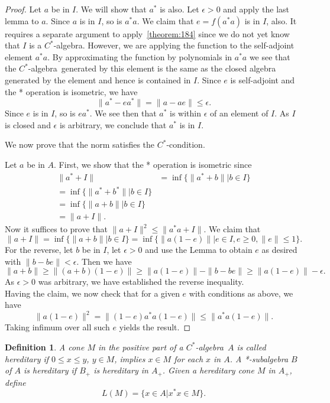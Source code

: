 \documentclass{book}
\newtheorem{definition}{Definition}[section]
\def\cstar{\(C^*\)-algebra}
\begin{document}
\begin{proof}
  Let \(a\) be in \(I\). We will show that \(a^*\) is also. Let \(\epsilon> 0\) and apply
  the last lemma to \(a\). Since \(a\) is in \(I\), so is \(a^*a\). We claim that \(e = f(a^*a)\) is
  in \(I\), also. It requires a separate argument to apply~\ref{theorem:184} since we do not yet
  know that \(I\) is a \cstar. However, we are applying the function to the
  self-adjoint element \(a^*a\). By approximating the function by polynomials in
  \(a^*a\) we see that the \cstar\ generated by this element is the same as the
  closed algebra generated by the element and hence is contained in \(I\).
  Since \(e\) is self-adjoint and the * operation is isometric, we have
  \[\|a^* - ea^*\| = \|a-ae\| \leq \epsilon.\]
  Since \(e\) is in \(I\), so is \(ea^*\). We see then that \(a^*\) is within \(\epsilon\) of an element of \(I\).
  As \(I\) is closed and \(\epsilon\) is arbitrary, we conclude that \(a^*\) is in \(I\).\par
  We now prove that the norm satisfies the \(C^*\)-condition.\par
  Let \(a\) be in \(A\). First, we show that the * operation is isometric since
  \begin{align*}
    \|a^* +I\| &= \inf\{\|a^*+b\| |b\in I\}\\
    = \inf\{\|a^* +b^*\| | b \in I\}\\
    = \inf\{\|a+b\| |b\in I\}\\
    = \|a+I\|.
  \end{align*}
  Now it suffices to prove that \(\|a+I\|^2 \leq \|a^*a+I\|\). We claim that
  \[\|a +I\| = \inf\{\|a+b\| |b\in I\}=\inf\{\|a(1-e)\| | e \in I,e \geq 0, \|e\| \leq 1\}.\]
  For the reverse, let \(b\) be in \(I\), let \(\epsilon> 0\) and use the Lemma to obtain \(e\) as
  desired with \(\|b - be\| <\epsilon\). Then we have
  \[\|a +b\| \geq \|(a+b)(1-e)\| \geq \|a(1-e)\| - \|b-be\| \geq \|a(1-e)\| - \epsilon.\]
  As \(\epsilon>0\) was arbitrary, we have established the reverse inequality.\\
  Having the claim, we now check that for a given \(e\) with conditions as
  above, we have
  \[\|a(1 -e) \|^2 = \|(1-e)a^*a(1-e)\| \leq \|a^*a(1-e)\| .\]
  Taking infimum over all such \(e\) yields the result.
\end{proof}

\begin{definition}
  A cone \(M\) in the positive part of a \cstar\ \(A\) is called \textnormal{hereditary} if 
  \(0 \leq x \leq y\), \(y \in M\), implies \(x \in M\) for each \(x\) in \(A\). A *-subalgebra \(B\) of \(A\) is
  \textnormal{hereditary} if \(B_+\) is hereditary in \(A_+\). Given a hereditary cone \(M\) in \(A_+\), define
  \[
    L(M)=\{x\in A| x^* x\in M\}.
  \]
\end{definition}
\end{document}
